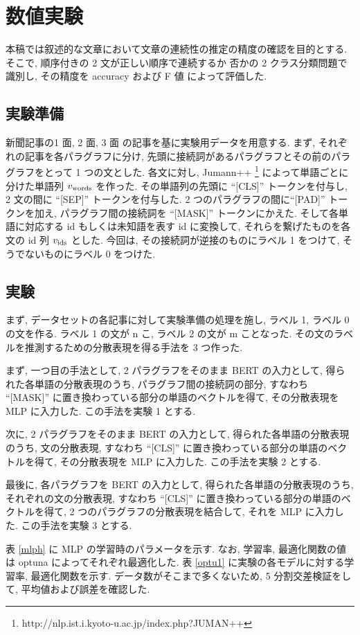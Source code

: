\documentclass[twocolumn]{jarticle}     %
\begin{document}
\section{数値実験}
本稿では叙述的な文章において文章の連続性の推定の精度の確認を目的とする.
そこで, 順序付きの 2 文が正しい順序で連続するか
否かの 2 クラス分類問題で識別し, その精度を accuracy および F 値 によって評価した.
\subsection{実験準備}
新聞記事の1 面, 2 面, 3 面 の記事を基に実験用データを用意する.
まず, それぞれの記事を各パラグラフに分け, 先頭に接続詞があるパラグラフとその前のパラグラフをとって 1 つの文とした.
各文に対し, Jumann++ \footnote{http:\slash\slash{}nlp.ist.i.kyoto-u.ac.jp\slash{}index.php?JUMAN++}
によって単語ごとに分けた単語列 $v_{\rm words}$ を作った.
その単語列の先頭に ``[CLS]'' トークンを付与し, 2 文の間に ``[SEP]'' トークンを付与した.
2 つのパラグラフの間に``[PAD]'' トークンを加え, パラグラフ間の接続詞を ``[MASK]'' トークンにかえた.
そして各単語に対応する id もしくは未知語を表す id に変換して, それらを繋げたものを各文の id 列 $v_{{\rm ids}}$ とした.
今回は, その接続詞が逆接のものにラベル 1 をつけて, そうでないものにラベル 0 をつけた.

\subsection{実験}
まず, データセットの各記事に対して実験準備の処理を施し, ラベル 1, ラベル 0 の文を作る.
ラベル 1 の文が n こ, ラベル 2 の文が m ことなった. 
その文のラベルを推測するための分散表現を得る手法を 3 つ作った. \par
まず, 一つ目の手法として, 2 パラグラフをそのまま BERT の入力として, 得られた各単語の分散表現のうち, 
パラグラフ間の接続詞の部分, すなわち ``[MASK]'' に置き換わっている部分の単語のベクトルを得て, その分散表現を MLP に入力した. 
この手法を実験 1 とする.  \par
次に, 2 パラグラフをそのまま BERT の入力として, 得られた各単語の分散表現のうち, 
文の分散表現, すなわち ``[CLS]'' に置き換わっている部分の単語のベクトルを得て, その分散表現を MLP に入力した. 
この手法を実験 2 とする. \par
最後に, 各パラグラフを BERT の入力として, 得られた各単語の分散表現のうち, 
それぞれの文の分散表現, すなわち ``[CLS]'' に置き換わっている部分の単語のベクトルを得て, 
2 つのパラグラフの分散表現を結合して, それを MLP に入力した. 
この手法を実験 3 とする. \par
表 \ref{mlph} に MLP の学習時のパラメータを示す.
なお,  学習率, 最適化関数の値は optuna によってそれぞれ最適化した. 
表 \ref{optu1} に実験の各モデルに対する学習率, 最適化関数を示す. 
データ数がそこまで多くないため, 5 分割交差検証をして, 平均値および誤差を確認した. 
\end{document}
